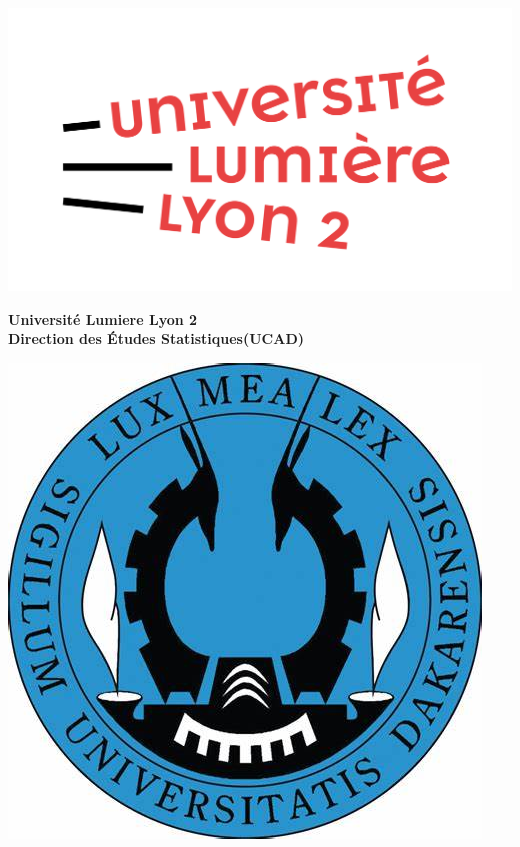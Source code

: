 \documentclass{article}
\begin{document}
\vspace*{-1.5cm}
\begin{tcolorbox}[colframe=myblue, colback=white, boxrule=1pt, arc=4pt, width=\textwidth, left=0pt, right=0pt, top=2pt, bottom=2pt]
    \begin{minipage}{0.18\textwidth}
        \includegraphics[width=\textwidth]{image/lyon.png}
    \end{minipage}
    \hfill
    \begin{minipage}{0.6\textwidth}
        \centering
        {\large\bfseries Université Lumiere  Lyon 2}\\[0.5em]
        {\large\bfseries Direction des Études Statistiques(UCAD)}\\[0.5em]

    \end{minipage}
    \hfill
    \begin{minipage}{0.18\textwidth}
        \includegraphics[width=\textwidth]{image/ucad.jpg}
    \end{minipage}
\end{tcolorbox}
\end{document}
